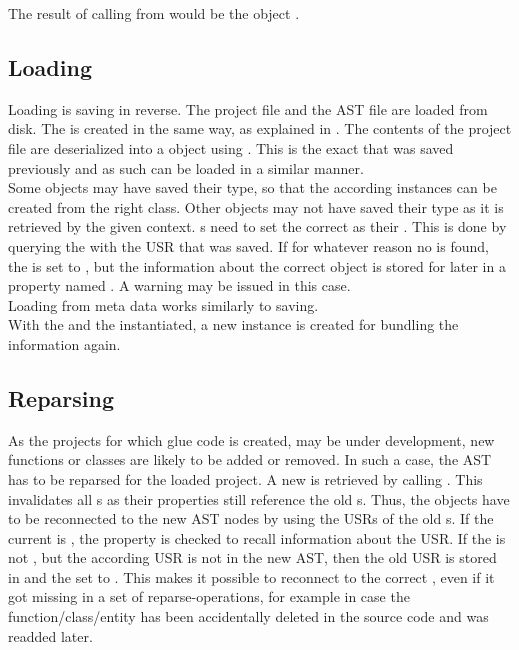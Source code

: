 The result of calling  from  would be the  object .

\subsection{Loading}

Loading is saving in reverse. The project file and the  AST file are loaded from disk. The  is created in the same way, as explained in . The contents of the project file are deserialized into a  object using . This is the exact  that was saved previously and as such can be loaded in a similar manner.\\
Some objects may have saved their type, so that the according instances can be created from the right class. Other objects may not have saved their type as it is retrieved by the given context. s need to set the correct  as their . This is done by querying the  with the USR that was saved. If for whatever reason no  is found, the  is set to , but the information about the correct object is stored for later in a property named . A warning may be issued in this case.\\
Loading from meta data works similarly to saving.\\
With the  and the  instantiated, a new  instance is created for bundling the information again.

\subsection{Reparsing}

As the  projects for which glue code is created, may be under development, new functions or classes are likely to be added or removed. In such a case, the  AST has to be reparsed for the loaded project. A new  is retrieved by calling . This invalidates all s as their  properties still reference the old s. Thus, the objects have to be reconnected to the new AST nodes by using the USRs of the old s. If the current  is , the  property is checked to recall information about the USR. If the  is not , but the according USR is not in the new AST, then the old USR is stored in  and the  set to . This makes it possible to reconnect to the correct , even if it got missing in a set of reparse-operations, for example in case the  function/class/entity has been accidentally deleted in the source code and was readded later.

